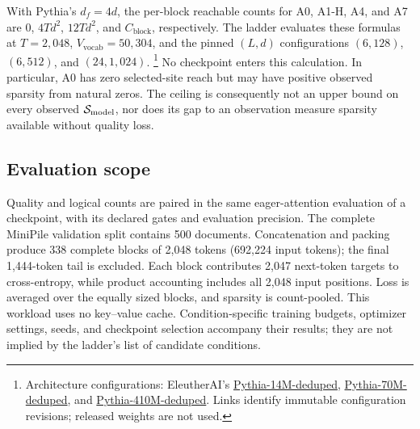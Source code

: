 With Pythia's $d_f=4d$, the per-block reachable counts for A0, A1-H, A4, and A7
are $0$, $4Td^2$, $12Td^2$, and $C_{\mathrm{block}}$, respectively. The ladder
evaluates these formulas at $T=2{,}048$, $V_{\!\mathrm{vocab}}=50{,}304$, and
the pinned $(L,d)$ configurations $(6,128)$, $(6,512)$, and $(24,1{,}024)$.%
\footnote{Architecture configurations: EleutherAI's
\href{https://huggingface.co/EleutherAI/pythia-14m-deduped/blob/7386d9a4ae45aef494a6e704910394def3037fc5/config.json}{Pythia-14M-deduped},
\href{https://huggingface.co/EleutherAI/pythia-70m-deduped/blob/e93a9faa9c77e5d09219f6c868bfc7a1bd65593c/config.json}{Pythia-70M-deduped}, and
\href{https://huggingface.co/EleutherAI/pythia-410m-deduped/blob/b5e8535141902c0e985cea61fd02afe7fe86af32/config.json}{Pythia-410M-deduped}.
Links identify immutable configuration revisions; released weights are not used.}
No checkpoint enters this calculation. In particular, A0 has zero selected-site
reach but may have positive observed sparsity from natural zeros. The ceiling
is consequently not an upper bound on every observed $\mathcal{S}_{\mathrm{model}}$, nor does its
gap to an observation measure sparsity available without quality loss.

\subsection{Evaluation scope}
\label{app:evaluation}

Quality and logical counts are paired in the same eager-attention evaluation
of a checkpoint, with its declared gates and evaluation precision. The complete
MiniPile validation split contains 500 documents. Concatenation and packing
produce 338 complete blocks of 2,048 tokens (692,224 input tokens); the final
1,444-token tail is excluded. Each block contributes 2,047 next-token targets
to cross-entropy, while product accounting includes all 2,048 input positions.
Loss is averaged over the equally sized blocks, and sparsity is count-pooled.
This workload uses no key--value cache. Condition-specific training budgets,
optimizer settings, seeds, and checkpoint selection accompany their results;
they are not implied by the ladder's list of candidate conditions.


